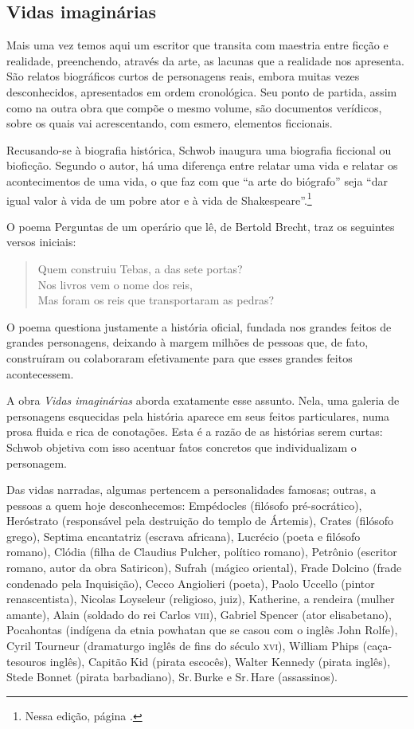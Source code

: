 \subsection{Vidas imaginárias}

Mais uma vez temos aqui um escritor que transita com maestria entre
ficção e realidade, preenchendo, através da arte, as lacunas que a
realidade nos apresenta. São relatos biográficos curtos de personagens
reais, embora muitas vezes desconhecidos, apresentados em ordem
cronológica. Seu ponto de partida, assim como na outra obra que compõe o
mesmo volume, são documentos verídicos, sobre os quais vai
acrescentando, com esmero, elementos ficcionais.

Recusando-se à biografia histórica, Schwob inaugura uma biografia
ficcional ou bioficção. Segundo o autor, há uma diferença entre relatar
uma vida e relatar os acontecimentos de uma vida, o que faz com que ``a
arte do biógrafo'' seja ``dar igual valor à vida de um pobre ator e à
vida de Shakespeare''.\footnote{Nessa edição, página \pageref{vida}.}

O poema Perguntas de um operário que lê, de Bertold Brecht, traz os
seguintes versos iniciais:

\begin{verse}
Quem construiu Tebas, a das sete portas?\\
Nos livros vem o nome dos reis,\\
Mas foram os reis que transportaram as pedras?\\
\end{verse}

O poema questiona justamente a história oficial, fundada nos grandes
feitos de grandes personagens, deixando à margem milhões de pessoas que,
de fato, construíram ou colaboraram efetivamente para que esses grandes
feitos acontecessem.

A obra \textit{Vidas imaginárias} aborda exatamente esse assunto. Nela, uma
galeria de personagens esquecidas pela história aparece em seus feitos
particulares, numa prosa fluida e rica de conotações. Esta é a razão de
as histórias serem curtas: Schwob objetiva com isso acentuar fatos
concretos que individualizam o personagem.

Das vidas narradas, algumas pertencem a personalidades famosas; outras,
a pessoas a quem hoje desconhecemos: Empédocles (filósofo
pré-socrático), Heróstrato (responsável pela destruição do templo de
Ártemis), Crates (filósofo grego), Septima encantatriz (escrava
africana), Lucrécio (poeta e filósofo romano), Clódia (filha de Claudius
Pulcher, político romano), Petrônio (escritor romano, autor da obra
Satiricon), Sufrah (mágico oriental), Frade Dolcino (frade condenado
pela Inquisição), Cecco Angiolieri (poeta), Paolo Uccello (pintor
renascentista), Nicolas Loyseleur (religioso, juiz), Katherine, a
rendeira (mulher amante), Alain (soldado do rei Carlos \textsc{viii}), Gabriel
Spencer (ator elisabetano), Pocahontas (indígena da etnia powhatan que
se casou com o inglês John Rolfe), Cyril Tourneur (dramaturgo inglês de
fins do século \textsc{xvi}), William Phips (caça-tesouros inglês), Capitão Kid
(pirata escocês), Walter Kennedy (pirata inglês), Stede Bonnet (pirata
barbadiano), Sr.\,Burke e Sr.\,Hare (assassinos).

